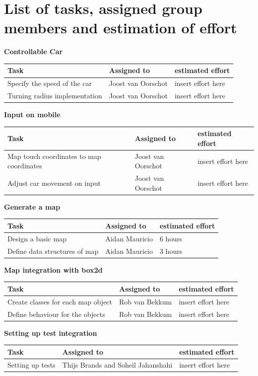 \documentclass{article}
\begin{document}
\section*{List of tasks, assigned group members and estimation of effort}
\textbf{Controllable Car} \\
\begin{tabular}{ | l | l | l | }
\hline
\textbf{Task} & \textbf{Assigned to} & \textbf{estimated effort} \\ \hline
Specify the speed of the car & Joost van Oorschot & insert effort here \\ \hline
Turning radius implementation & Joost van Oorschot & insert effort here \\ \hline
\end{tabular} \newline
\newline
\textbf{Input on mobile} \\
\begin{tabular}{ | l | l | l | }
\hline
\textbf{Task} & \textbf{Assigned to} & \textbf{estimated effort} \\ \hline
Map touch coordinates to map coordinates & Joost van Oorschot & insert effort here \\ \hline
Adjust car movement on input & Joost van Oorschot & insert effort here \\ \hline
\end{tabular} \newline
\newline
\textbf{Generate a map} \\
\begin{tabular}{ | l | l | l | }
\hline
\textbf{Task} & \textbf{Assigned to} & \textbf{estimated effort} \\ \hline
Design a basic map & Aidan Mauricio & 6 hours \\ \hline
Define data structures of map & Aidan Mauricio & 3 hours \\ \hline
\end{tabular} \newline
\newline
\textbf{Map integration with box2d} \\
\begin{tabular}{ | l | l | l | }
\hline
\textbf{Task} & \textbf{Assigned to} & \textbf{estimated effort} \\ \hline
Create classes for each map object & Rob van Bekkum & insert effort here \\ \hline
Define behaviour for the objects & Rob van Bekkum & insert effort here \\ \hline
\end{tabular} \newline
\newline
\textbf{Setting up test integration} \\
\begin{tabular}{ | l | l | l | }
\hline
\textbf{Task} & \textbf{Assigned to} & \textbf{estimated effort} \\ \hline
Setting up tests & Thijs Brands and Soheil Jahanshahi & insert effort here \\ \hline
\end{tabular} \newline
\end{document}
